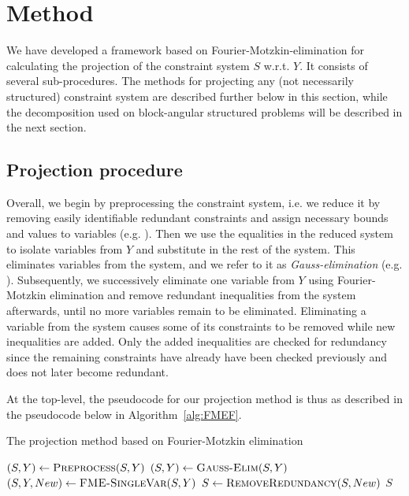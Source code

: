 %
%
\section{Method}\label{sec:methods}
We have developed a framework based on Fourier-Motzkin-elimination for calculating the projection of the constraint system $S$ w.r.t. $Y$. It %
consists of several sub-procedures. The methods for projecting any (not necessarily structured) constraint system are described further below in this section, while the decomposition used on block-angular structured problems will be described in the next section.

\subsection{Projection procedure}
Overall, we begin by preprocessing the constraint system, i.e. we reduce it by removing easily identifiable redundant constraints and assign necessary bounds and values to variables (e.g. \cite{brearley75,andersen95,maros}).
Then we use the equalities in the reduced system to isolate variables from $Y$ and substitute in the rest of the system. This eliminates variables from the system, and we refer to it as \emph{Gauss-elimination} (e.g. \cite{duffin74,simon05}).  
Subsequently, we successively eliminate one variable from $Y$ using Fourier-Motzkin elimination and remove redundant inequalities from the system afterwards, until no more variables remain to be eliminated. Eliminating a variable from the system causes some of its constraints to be removed while new inequalities are added. Only the added inequalities are checked for redundancy since the remaining constraints have already have been checked previously and does not later become redundant. 

At the top-level, the pseudocode for our projection method is thus as described in the pseudocode below in Algorithm~\ref{alg:FMEF}. 

\begin{algorithm}
\caption{The projection method based on Fourier-Motzkin elimination} 
\label{alg:FMEF}
\begin{algorithmic}
	\State $(S,Y)\gets \Call{Preprocess}{S,Y}$
	\State $(S,Y)\gets\Call{Gauss-Elim}{S,Y}$
		\State $(S, Y, New )\gets\Call{FME-SingleVar}{S,Y}$
		\State $S\gets\Call{RemoveRedundancy}{S,New}$
	\EndWhile
	\State \Return $S$
\EndFunction
\end{algorithmic}
\end{algorithm}

